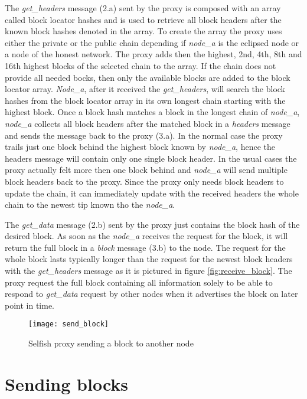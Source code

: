 The \textit{get\_headers} message (2.a) sent by the proxy is composed with an array called block locator hashes and is used to retrieve all block headers after the known block hashes denoted in the array.
To create the array the proxy uses either the private or the public chain depending if \textit{node\_a} is the eclipsed node or a node of the honest network.
The proxy adds then the highest, 2nd, 4th, 8th and 16th highest blocks of the selected chain to the array.
If the chain does not provide all needed bocks, then only the available blocks are added to the block locator array.
\textit{Node\_a}, after it received the \textit{get\_headers}, will search the block hashes from the block locator array in its own longest chain starting with the highest block.
Once a block hash matches a block in the longest chain of \textit{node\_a}, \textit{node\_a} collects all block headers after the matched block in a \textit{headers} message and sends the message back to the proxy (3.a).
In the normal case the proxy trails just one block behind the highest block known by \textit{node\_a}, hence the headers message will contain only one single block header.
In the usual cases the proxy actually felt more then one block behind and \textit{node\_a} will send multiple block headers back to the proxy.
Since the proxy only needs block headers to update the chain, it can immediately update with the received headers the whole chain to the newest tip known tho the \textit{node\_a}.

The \textit{get\_data} message (2.b) sent by the proxy just contains the block hash of the desired block.
As soon as the \textit{node\_a} receives the request for the block, it will return the full block in a \textit{block} message (3.b) to the node.
The request for the whole block lasts typically longer than the request for the newest block headers with the \textit{get\_headers} message as it is pictured in figure \ref{fig:receive_block}.
The proxy request the full block containing all information solely to be able to respond to \textit{get\_data} request by other nodes when it advertises the block on later point in time.

\begin{figure}
	\centering
    \texttt{[image: send\_block]}
    \caption{Selfish proxy sending a block to another node}
    \label{fig:send_block}
\end{figure}

\section{Sending blocks}

